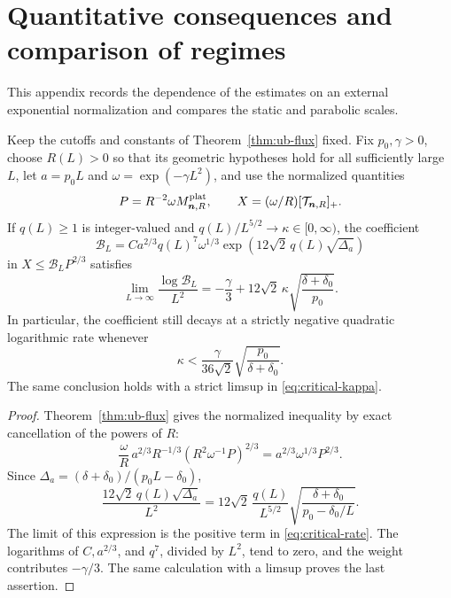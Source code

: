 \section{Quantitative consequences and comparison of regimes}
\label{sec:consequences}

This appendix records the dependence of the estimates on an external
exponential normalization and compares the static and parabolic scales.

\begin{corollary}
\label{cor:critical-coefficient}
Keep the cutoffs and constants of Theorem~\ref{thm:ub-flux} fixed.
Fix \(p_0,\gamma>0\), choose \(R(L)>0\) so that its geometric
hypotheses hold for all sufficiently large \(L\), let \(a=p_0L\) and
\(\omega=\exp(-\gamma L^2)\), and use the normalized quantities
\[
 P=R^{-2}\omega M^{\rm plat}_{\boldsymbol n,R},
 \qquad X=(\omega/R)[\mathcal T_{\boldsymbol n,R}]_+.
\]
If \(q(L)\ge1\) is integer-valued and
\(q(L)/L^{5/2}\to\kappa\in[0,\infty)\), the coefficient
\[
 \mathcal B_L
 =C a^{2/3}q(L)^7\omega^{1/3}
          \exp(12\sqrt2\,q(L)\sqrt{\Delta_a})
\]
in \(X\le\mathcal B_LP^{2/3}\) satisfies
\begin{equation}\label{eq:critical-rate}
 \lim_{L\to\infty}\frac{\log\mathcal B_L}{L^2}
 =-\frac{\gamma}{3}
       +12\sqrt2\,\kappa\sqrt{\frac{\delta+\delta_0}{p_0}}.
\end{equation}
In particular, the coefficient still decays at a strictly negative
quadratic logarithmic rate whenever
\begin{equation}\label{eq:critical-kappa}
 \kappa<
 \frac{\gamma}{36\sqrt2}
           \sqrt{\frac{p_0}{\delta+\delta_0}}.
\end{equation}
The same conclusion holds with a strict limsup in
\eqref{eq:critical-kappa}.
\end{corollary}

\begin{proof}
Theorem~\ref{thm:ub-flux} gives the normalized inequality by exact
cancellation of the powers of \(R\):
\[
 \frac{\omega}{R}\,
     a^{2/3}R^{-1/3}(R^2\omega^{-1}P)^{2/3}
 =a^{2/3}\omega^{1/3}P^{2/3}.
\]
Since \(\Delta_a=(\delta+\delta_0)/(p_0L-\delta_0)\),
\[
 \frac{12\sqrt2\,q(L)\sqrt{\Delta_a}}{L^2}
 =12\sqrt2\,\frac{q(L)}{L^{5/2}}
       \sqrt{\frac{\delta+\delta_0}{p_0-\delta_0/L}}.
\]
The limit of this expression is the positive term in
\eqref{eq:critical-rate}. The logarithms of \(C,a^{2/3}\), and \(q^7\),
divided by \(L^2\), tend to zero, and the weight contributes
\(-\gamma/3\). The same calculation with a limsup proves the last
assertion.
\end{proof}

